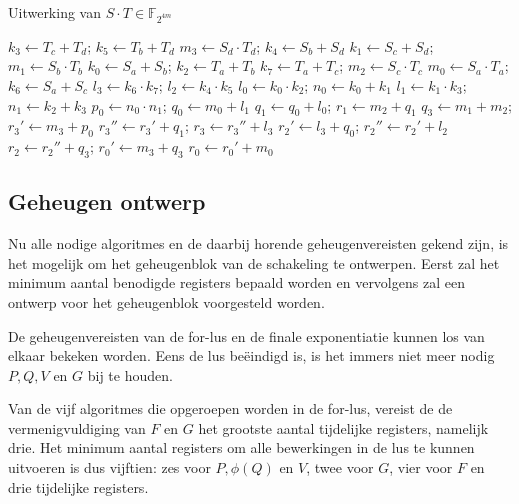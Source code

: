 
\begin{algorithm}
	\caption{Uitwerking van $S \cdot T \in \mathbb{F}_{2^{4m}}$}
	\label{algoritme-implementatie-miller-f4m-mult}
	$k_3 \leftarrow T_c + T_d$; $k_5 \leftarrow T_b + T_d$\;
	$m_3 \leftarrow S_d \cdot T_d$; $k_4 \leftarrow S_b + S_d$\;
	$k_1 \leftarrow S_c + S_d$; $m_1 \leftarrow S_b \cdot T_b$\;
	$k_0 \leftarrow S_a + S_b$; $k_2 \leftarrow T_a + T_b$\;
	$k_7 \leftarrow T_a + T_c$; $m_2 \leftarrow S_c \cdot T_c$\;
	$m_0 \leftarrow S_a \cdot T_a$; $k_6 \leftarrow S_a + S_c$\;
	$l_3 \leftarrow k_6 \cdot k_7$; $l_2 \leftarrow k_4 \cdot k_5$\;
	$l_0 \leftarrow k_0 \cdot k_2$; $n_0 \leftarrow k_0 + k_1$\;
	$l_1 \leftarrow k_1 \cdot k_3$; $n_1 \leftarrow k_2 + k_3$\;
	$p_0 \leftarrow n_0 \cdot n_1$; $q_0 \leftarrow m_0 + l_1$\;
	$q_1 \leftarrow q_0 + l_0$; $r_1 \leftarrow m_2 + q_1$\;
	$q_3 \leftarrow m_1 + m_2$; $r_3' \leftarrow m_3 + p_0$\;
	$r_3'' \leftarrow r_3' + q_1$; $r_3 \leftarrow r_3'' + l_3$\;
	$r_2' \leftarrow l_3 + q_0$; $r_2'' \leftarrow r_2' + l_2$\;
	$r_2 \leftarrow r_2'' + q_3$; $r_0' \leftarrow m_3 + q_3$\;
	$r_0 \leftarrow r_0' + m_0$\;
\end{algorithm}

\subsection{Geheugen ontwerp}

Nu alle nodige algoritmes en de daarbij horende geheugenvereisten gekend zijn, is het mogelijk om het geheugenblok van de schakeling te ontwerpen. Eerst zal het minimum aantal benodigde registers bepaald worden en vervolgens zal een ontwerp voor het geheugenblok voorgesteld worden.

De geheugenvereisten van de for-lus en de finale exponentiatie kunnen los van elkaar bekeken worden. Eens de lus be\"eindigd is, is het immers niet meer nodig $P, Q, V$ en $G$ bij te houden.

Van de vijf algoritmes die opgeroepen worden in de for-lus, vereist de de vermenigvuldiging van $F$ en $G$ het grootste aantal tijdelijke registers, namelijk drie. Het minimum aantal registers om alle bewerkingen in de lus te kunnen uitvoeren is dus vijftien: zes voor $P, \phi(Q)$ en $V$, twee voor $G$, vier voor $F$ en drie tijdelijke registers.

